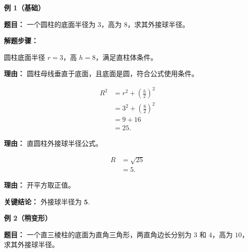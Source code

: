 \begin{examplebox}
	\textbf{\textcolor{CExample}{例 1（基础）}}

	\textbf{\textcolor{CExample}{题目：}}
	一个圆柱的底面半径为 $3$，高为 $8$，求其外接球半径。

	\textbf{\textcolor{CExample}{解题步骤：}}
	\begin{description}[style=nextline, leftmargin=2.8em, labelsep=0.5em, itemsep=0.45em]
		\item[\textbf{第一步（识别条件）：}] 圆柱底面半径 $r=3$，高 $h=8$，满足直柱体条件。
			\par\textbf{理由：} 圆柱母线垂直于底面，且底面是圆，符合公式使用条件。
		\item[\textbf{第二步（套用公式）：}]
			\[
				\begin{aligned}
					R^2 &= r^2 + \left(\frac{h}{2}\right)^2 \\
					&= 3^2 + \left(\frac{8}{2}\right)^2 \\
					&= 9 + 16 \\
					&= 25.
			\end{aligned}
			\]
			\par\textbf{理由：} 直圆柱外接球半径公式。
		\item[\textbf{第三步（求半径）：}]
			\[
				\begin{aligned}
					R &= \sqrt{25} \\
					&= 5.
			\end{aligned}
			\]
			\par\textbf{理由：} 开平方取正值。
	\end{description}

	\textbf{\textcolor{CExample}{关键结论：}}
	外接球半径为 $\mathbf{5}$.

	\medskip
	\textbf{\textcolor{CExample}{例 2（稍变形）}}

	\textbf{\textcolor{CExample}{题目：}}
	一个直三棱柱的底面为直角三角形，两直角边长分别为 $3$ 和 $4$，高为 $10$，求其外接球半径。


\end{examplebox}
